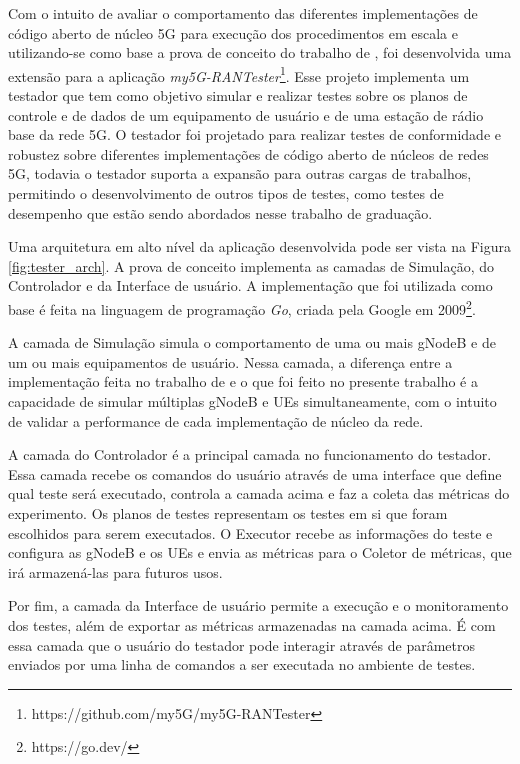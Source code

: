 
Com o intuito de avaliar o comportamento das diferentes implementações de código aberto de núcleo 5G para execução dos procedimentos em escala e utilizando-se como base a prova de conceito do trabalho de \cite{Dominato2021}, foi desenvolvida uma extensão para a aplicação \textit{my5G-RANTester}\footnote{https://github.com/my5G/my5G-RANTester}.
Esse projeto implementa um testador que tem como objetivo simular e realizar testes sobre os planos de controle e de dados de um equipamento de usuário e de uma estação de rádio base da rede 5G.
O testador foi projetado para realizar testes de conformidade e robustez sobre diferentes implementações de código aberto de núcleos de redes 5G, todavia o testador suporta a expansão para outras cargas de trabalhos, permitindo o desenvolvimento de outros tipos de testes, como testes de desempenho que estão sendo abordados nesse trabalho de graduação.

Uma arquitetura em alto nível da aplicação desenvolvida pode ser vista na Figura \ref{fig:tester_arch}.
A prova de conceito implementa as camadas de Simulação, do Controlador e da Interface de usuário.
A implementação que foi utilizada como base é feita na linguagem de programação \textit{Go}, criada pela Google em 2009\footnote{https://go.dev/}.

A camada de Simulação simula o comportamento de uma ou mais gNodeB e de um ou mais equipamentos de usuário.
Nessa camada, a diferença entre a implementação feita no trabalho de \cite{Dominato2021} e o que foi feito no presente trabalho é a capacidade de simular múltiplas gNodeB e UEs simultaneamente, com o intuito de validar a performance de cada implementação de núcleo da rede.

A camada do Controlador é a principal camada no funcionamento do testador. Essa camada recebe os comandos do usuário através de uma interface que define qual teste será executado, controla a camada acima e faz a coleta das métricas do experimento.
Os planos de testes representam os testes em si que foram escolhidos para serem executados. O Executor recebe as informações do teste e configura as gNodeB e os UEs e envia as métricas para o Coletor de métricas, que irá armazená-las para futuros usos.

Por fim, a camada da Interface de usuário permite a execução e o monitoramento dos testes, além de exportar as métricas armazenadas na camada acima. É com essa camada que o usuário do testador pode interagir através de parâmetros enviados por uma linha de comandos a ser executada no ambiente de testes.


